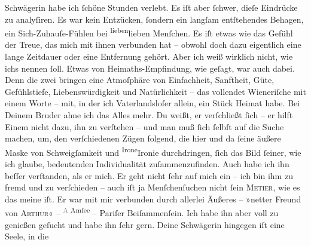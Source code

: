 \begin{ledgroupsized}[t]{13cm}
                  Schwägerin habe ich
               ſchöne Stunden verlebt. Es iſt aber ſchwer, dieſe Eindrücke zu analyſiren. Es war
               kein Entzücken, ſondern ein langſam entſtehendes Behagen, ein Sich-Zuhauſe-Fühlen bei \substVorne{}\textsuperscript{lieben}{\allowbreak}\substDazwischen{}lieben\substHinten{} Menſchen. Es iſt etwas wie das Gefühl der Treue, das mich mit ihnen
               verbunden hat – obwohl doch dazu eigentlich eine lange Zeitdauer oder eine Entfernung
               gehört. Aber ich weiß wirklich nicht, wie ichs nennen ſoll. Etwas von
               Heimaths-Empfindung, wie geſagt, {\pb}war auch dabei.
               Denn die zwei bringen eine Atmoſphäre von Einfachheit, Sanftheit, Güte, Gefühlstiefe,
               Liebenswürdigkeit und Natürlichkeit – das vollendet Wieneriſche mit einem Worte – mit, in der ich Vaterlandsloſer allein, \strikeout{\textcolor{gray}{man}} ein Stück Heimat habe. Bei Deinem Bruder ahne ich das Alles mehr. Du weißt, er verſchließt
               ſich – er hilft Einem nicht dazu, ihn zu verſtehen – und man muß ſich ſelbſt auf die
               Suche machen, um, den verſchiedenen Zügen folgend, die hier und da ſeine äußere Maske
               von Schweigſamkeit und \substVorne{}\textsuperscript{Irone}\substDazwischen{}Ironie\substHinten{} durchdringen, ſich {\pb}das Bild ſeiner, wie
               ich glaube, bedeutenden Individualität zuſammenzufinden. Auch habe ich ihn beſſer
               verſtanden, als er mich. Er geht nicht ſehr auf mich ein – ich bin ihm zu fremd und
               zu verſchieden – auch iſt ja Menſchenſuchen nicht ſein \textsc{Metier}, wie es das meine iſt. Er war mit mir verbunden durch allerlei
               Äußeres – »netter Freund von \textsc{Arthur}« – \substVorne{}\textsuperscript{\textcolor{gray}{A} Amſee}{\allowbreak}\substDazwischen{}\textsc{\label{K_L02608-1v}\label{K_L02608-1h}}\substHinten{} – Pariſer Beiſammenſein. Ich habe ihn
               aber voll zu genießen geſucht und habe ihn ſehr gern. Deine Schwägerin hingegen iſt eine Seele, in die

\end{ledgroupsized}
